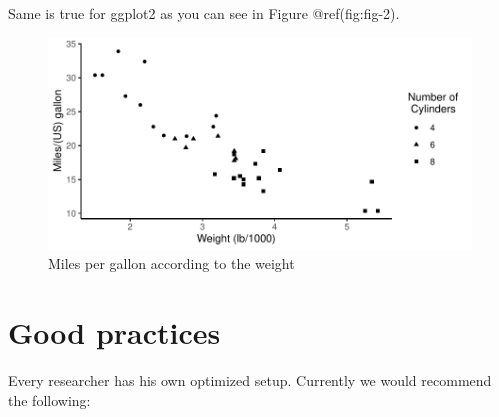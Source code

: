 \documentclass[
  12pt,
]{article}
\newenvironment{Shaded}{\begin{snugshade}}{\end{snugshade}}
\newcommand{\AttributeTok}[1]{\textcolor[rgb]{0.13,0.29,0.53}{#1}}
\newcommand{\CommentTok}[1]{\textcolor[rgb]{0.56,0.35,0.01}{\textit{#1}}}
\newcommand{\FunctionTok}[1]{\textcolor[rgb]{0.13,0.29,0.53}{\textbf{#1}}}
\newcommand{\NormalTok}[1]{#1}
\newcommand{\OtherTok}[1]{\textcolor[rgb]{0.56,0.35,0.01}{#1}}
\newcommand{\SpecialCharTok}[1]{\textcolor[rgb]{0.81,0.36,0.00}{\textbf{#1}}}
\newcommand{\StringTok}[1]{\textcolor[rgb]{0.31,0.60,0.02}{#1}}
\begin{document}
Same is true for ggplot2 as you can see in Figure @ref(fig:fig-2).

\begin{Shaded}
\end{Shaded}

\begin{figure}[H]

{\centering \includegraphics{paper_files/figure-latex/fig-2-1} 

}

\caption{Miles per gallon according to the weight}\label{fig:fig-2}
\end{figure}

\hypertarget{good-practices}{%
\section{Good practices}\label{good-practices}}

Every researcher has his own optimized setup. Currently we would
recommend the following:
\end{document}
